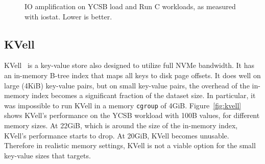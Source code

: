 \begin{figure}
   \caption{IO amplification on YCSB load and Run C workloads, as
   measured with iostat. Lower is better.}\label{fig:ycsb-amp-100B}
\end{figure}

\subsection{KVell}\label{sec:kvell}

KVell~\cite{!kvell} is a key-value store also designed to utilize full NVMe bandwidth.
It has an in-memory B-tree index that maps all keys to disk page offsets.
It does well on large (4KiB) key-value pairs, but on small key-value pairs, the overhead
of the in-memory index becomes a significant fraction of the dataset size.
In particular, it was impossible to run KVell in a memory \texttt{cgroup} of 4GiB.
Figure~\ref{fig:kvell} shows KVell's performance on the YCSB workload with 100B values,
for different memory sizes. At 22GiB, which is around the size of the in-memory index,
KVell's performance starts to drop. At 20GiB, KVell becomes unusable. Therefore in realistic
memory settings, KVell is not a viable option for the small key-value sizes that \sysname targets.

